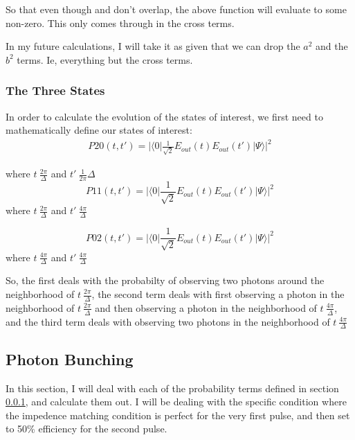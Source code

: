 \documentclass[12pt]{article}
\begin{document}
\begin{enumerate}
So that even though \Theta and \Phi don't overlap, the above function will evaluate to some non-zero. This only comes through in the cross terms.

In my future calculations, I will take it as given that we can drop the $a^2$ and the $b^2$ terms. Ie, everything but the cross terms.

\subsubsection{The Three States}
\label{sec:three}
In order to calculate the evolution of the states of interest, we first need to mathematically define our states of interest:
\begin{align}
\label{eq:p20}
P20(t,t') = | \langle 0 | \frac{1}{\sqrt{2}} E_{out}(t) E_{out}(t') | \Psi \rangle |^2
\end{align}

where $t~\frac{2\pi}{\Delta}$ and $t' ~\frac{1}{2 \pi}{\Delta}$
\begin{equation}
\label{eq:p11}
P11(t,t') = | \langle 0 | \frac{1}{\sqrt{2}} E_{out}(t) E_{out}(t') | \Psi \rangle |^2
\end{equation}
where $t~\frac{2\pi}{\Delta}$ and $t'~\frac{4 \pi}{\Delta}$

\begin{equation}
\label{eq:p02}
P02(t,t') = | \langle 0 | \frac{1}{\sqrt{2}} E_{out}(t) E_{out}(t') | \Psi \rangle |^2
\end{equation}
where $t~\frac{4\pi}{\Delta}$ and $t'~\frac{4\pi}{\Delta}$

So, the first deals with the probabilty of observing two photons around the neighborhood of $t~\frac{2 \pi}{\Delta}$, the second term deals with first observing a photon in the neighborhood of $t~\frac{2 \pi}{\Delta}$ and then observing a photon in the neighborhood of $t~\frac{4 \pi}{\Delta}$, and the third term deals with observing two photons in the neighborhood
of $t~\frac{4 \pi}{\Delta}$

\label{eqderv}
\subsection{Photon Bunching}
\label{phbnch}

In this section, I will deal with each of the probability terms defined in section \ref{sec:three}, and calculate them out. I will be dealing with the specific condition where the impedence matching condition is perfect for the very first pulse, and then set to 50\% efficiency for the second pulse.


\end{enumerate}
\end{document}
